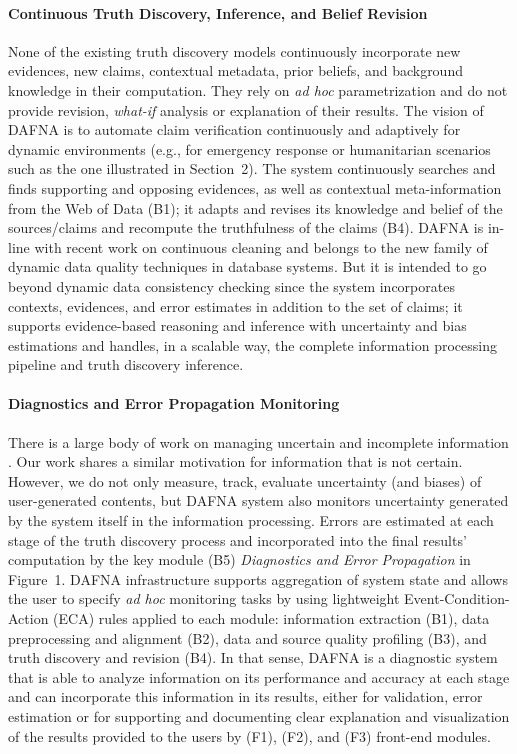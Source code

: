 \documentclass[prodmode,acmtecs]{acmsmall} %
\begin{document}
\paragraph*{Continuous Truth Discovery, Inference, and Belief Revision }



None of the existing truth discovery models continuously incorporate new evidences, 
new claims, contextual metadata, prior beliefs, and background knowledge in their computation.
They rely on {\it ad hoc} parametrization and do not provide revision, {\it what-if} analysis
or explanation of their results. The vision of DAFNA is to automate claim verification continuously
and adaptively for dynamic environments (e.g., for emergency response or humanitarian scenarios such
as the one illustrated in Section~2). The system continuously searches and finds supporting and opposing 
evidences, as well as contextual meta-information from the Web of Data (B1); it adapts and revises its knowledge
and belief of the sources/claims and recompute the truthfulness of the claims (B4).  
DAFNA is in-line with recent work on continuous cleaning \cite{VCSM14} and belongs to the new family of dynamic data 
quality techniques in database systems. But it is intended to go beyond dynamic data consistency checking since the 
system incorporates contexts, evidences, and error estimates in addition to the set of claims; it supports evidence-based
reasoning and inference with uncertainty and bias estimations and handles, in a scalable way, the complete information processing
pipeline and truth discovery inference.

\paragraph*{Diagnostics and Error Propagation Monitoring}


There is a large body of work on managing uncertain and incomplete information \cite{GreenT06,AgrawalSUW10}. Our work shares a similar 
motivation for information that is not certain. However, we do not only measure, track, evaluate uncertainty (and biases) of user-generated 
contents, but DAFNA system also monitors uncertainty generated by the system itself in the information processing. Errors are estimated at 
each stage of the truth discovery process and incorporated into the final results' computation by the key module (B5) {\it Diagnostics and Error
Propagation} in Figure~1. DAFNA infrastructure supports aggregation of system state and allows the user to specify {\it ad hoc} monitoring tasks 
by using lightweight Event-Condition-Action (ECA) rules applied to each module: information extraction (B1),  data preprocessing and alignment (B2),
data and source quality profiling (B3), and truth discovery  and revision (B4). In that sense,  DAFNA is a diagnostic system that is able to analyze 
information on its performance and accuracy at each stage and can incorporate this information in its results, either for validation, error estimation
or for supporting and documenting clear  explanation and visualization of the results provided to the users by (F1), (F2), and (F3) front-end modules. 
\fi
\end{document}
